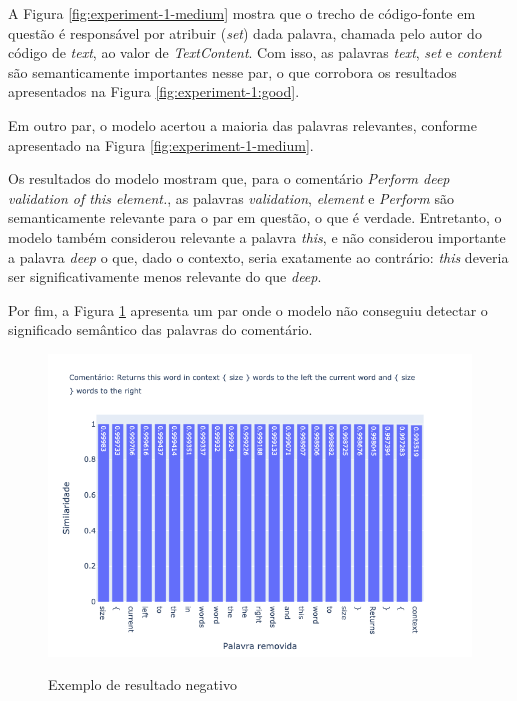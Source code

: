 A Figura \ref{fig:experiment-1-medium} mostra que o trecho de código-fonte em questão é responsável por atribuir (\textit{set}) dada palavra, chamada pelo autor do código de \textit{text}, ao valor de \textit{TextContent}. Com isso, as palavras \textit{text}, \textit{set} e \textit{content} são semanticamente importantes nesse par, o que corrobora os resultados apresentados na Figura \ref{fig:experiment-1:good}.

Em outro par, o modelo acertou a maioria das palavras relevantes, conforme apresentado na Figura \ref{fig:experiment-1-medium}.

Os resultados do modelo mostram que, para o comentário \textit{Perform deep validation of this element.}, as palavras \textit{validation}, \textit{element} e \textit{Perform} são semanticamente relevante para o par em questão, o que é verdade. Entretanto, o modelo também considerou relevante a palavra \textit{this}, e não considerou importante a palavra \textit{deep} o que, dado o contexto, seria exatamente ao contrário: \textit{this} deveria ser significativamente menos relevante do que \textit{deep}.

Por fim, a Figura \ref{fig:experiment-1-bad} apresenta um par onde o modelo não conseguiu detectar o significado semântico das palavras do comentário.

\begin{figure}[H]
  \centering
    \caption{Exemplo de resultado negativo}
    \includegraphics[scale=0.6]{imagens/resultados/experiment-1/sample_29.png}
    \label{fig:experiment-1-bad}
\end{figure}

